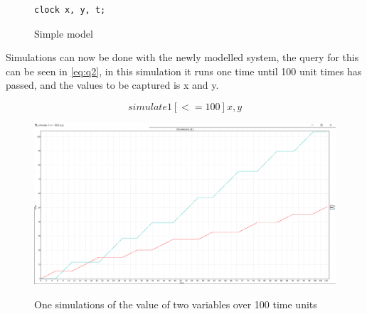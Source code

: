 \begin{figure}
	\begin{lstlisting}[language=my_c, caption={Declarations}, label=lst:showcase1_declarations]
	clock x, y, t;
	\end{lstlisting}
\end{figure}

\begin{figure}
	\centering
	\caption{Simple model}
	\label{fig:showcase01}
\end{figure}

Simulations can now be done with the newly modelled system, the query for this can be seen in \cref{eq:q2}, in this simulation it runs one time until 100 unit times has passed, and the values to be captured is x and y.

\begin{equation}\label{eq:q2}
simulate 1 [<= 100] {x,y}
\end{equation}

\begin{figure}[!h]
	\includegraphics[width=\textwidth]{graphics/showcase01.png}
	\label{fig:sim01}
	\caption{One simulations of the value of two variables  over 100 time units}
\end{figure}

